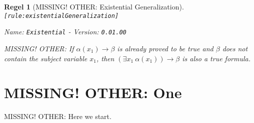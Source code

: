 \documentclass[a4paper,german,10pt,twoside]{book}
\newtheorem{rul}{Regel}
\theoremstyle{definition}
\theoremstyle{remark}
\begin{document}
\begin{rul}[MISSING! OTHER: Existential Generalization]
\label{rule:existentialGeneralization} \hypertarget{rule:existentialGeneralization}{}
{\tt \tiny [\verb]rule:existentialGeneralization]]}

\par
{\em   Name: \verb]Existential]  -  Version: \verb]0.01.00]}


MISSING! OTHER: If $\alpha(x_1) \rightarrow \beta$ is already proved to be true and $\beta$ does not contain the subject variable $x_1$, then $(\exists x_1~\alpha(x_1)) \rightarrow \beta$ is also a true formula.
\end{rul}


\section{MISSING! OTHER: One} \label{chapter1_section2} \hypertarget{chapter1_section2}{}
MISSING! OTHER: Here we start.
\end{document}
